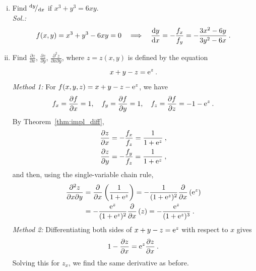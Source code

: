 \begin{example}
\label{expl:impl_diff}
\begin{enumerate}[(i)]
	\item Find ${}^{\mathrm{d} y}\!/_{\mathrm{d} x}$ if $ x^3+y^3=6xy$.\\
	{\it Sol.:}
	\[ f(x,y)=x^3 + y^3 - 6xy = 0	
		\quad \Longrightarrow \quad \displaystyle{\frac{\mathrm{d}y}{\mathrm{d}x}} = -\frac{f_x}{f_y}= -\frac{3x^2-6y}{3y^2-6x} \:. \]
	\item Find $\tfrac{\partial z}{\partial x}$, $\tfrac{\partial z}{\partial y}$, $\tfrac{\partial^2 z}{\partial x \partial y}$, where $z=z(x,y)$ is defined by the equation
	\[ x+y-z=\mathrm{e}^z \:. \]
	{\it Method 1:} For $f(x,y,z)=x+y-z-\mathrm{e}^z$, we have
	\[f_x = \displaystyle{\frac{\partial f}{\partial x}} = 1, \quad f_y= \displaystyle{\frac{\partial f}{\partial y}} = 1, \quad
	f_z = \displaystyle{\frac{\partial f}{\partial z}} = -1-\mathrm{e}^z \:. \]
	By Theorem~\ref{thm:impl_diff}, 
	\begin{equation*}
	\begin{split}
	\displaystyle{\frac{\partial z}{\partial x}} & = - \frac{f_x}{f_z}= \frac{1}{1+\mathrm{e}^z} \:,\\
	\displaystyle{\frac{\partial z}{\partial y}} & = - \frac{f_y}{f_z}= \frac{1}{1+\mathrm{e}^z} \:,
	\end{split}
	\end{equation*}
	and then, using the single-variable chain rule,
	\begin{equation*}
	\begin{split}
	\displaystyle{\frac{\partial^2 z}{\partial{x}\partial{y}}} & = \displaystyle{\frac{\partial }{\partial x}} \left( \frac{1}{1+\mathrm{e}^z} \right) 
	= - \frac{1}{(1+\mathrm{e}^z)^2} \displaystyle{\frac{\partial }{\partial x}} \left( \mathrm{e}^z \right) \\
	& = - \frac{\mathrm{e}^z}{(1+\mathrm{e}^z)^2} \displaystyle{\frac{\partial }{\partial x}} \left( z \right)	= - \frac{\mathrm{e}^z}{(1+\mathrm{e}^z)^3} \:.
	\end{split}
	\end{equation*}
	{\it Method 2:} Differentiating both sides of $x+y-z=\mathrm{e}^z$ with respect to $x$ gives
	\[ 1 - \displaystyle{\frac{\partial z}{\partial x}} = \mathrm{e}^z \displaystyle{\frac{\partial z}{\partial x}} \:. \]
	Solving this for $z_x$, we find the same derivative as before.
	

\end{enumerate}
\end{example}
